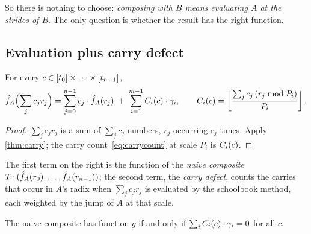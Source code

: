 \noindent So there is nothing to choose: \emph{composing with $B$ means evaluating $A$ at the
strides of $B$}. The only question is whether the result has the right function.

\subsection{Evaluation plus carry defect}

\begin{theorem}\label{thm:defect}
For every $c\in[t_0]\times\dots\times[t_{n-1}]$,
\begin{equation}\label{eq:defect}
 \hat{f}_{A}\Bigl(\sum_jc_jr_j\Bigr)=\sum_{j=0}^{n-1}c_j\cdot\hat{f}_{A}(r_j)\;+\;\sum_{i=1}^{m-1}C_i(c)\cdot\gamma_i,
\qquad
 C_i(c)=\left\lfloor \frac{\sum_jc_j\,(r_j\bmod P_i)}{P_i} \right\rfloor .
\end{equation}
\end{theorem}
\begin{proof}
$\sum_jc_jr_j$ is a sum of $\sum_jc_j$ numbers, $r_j$ occurring $c_j$ times. Apply
\cref{thm:carry}; the carry count~\eqref{eq:carrycount} at scale $P_i$ is $C_i(c)$.
\end{proof}

The first term on the right is the function of the \emph{naive composite}
$T\,{:}\,(\hat{f}_{A}(r_0),\dots,\hat{f}_{A}(r_{n-1}))$; the second term, the \emph{carry defect}, counts
the carries that occur in $A$'s radix when $\sum_jc_jr_j$ is evaluated by the schoolbook
method, each weighted by the jump of $A$ at that scale.

\begin{corollary}[\mech]\label{cor:naive}
The naive composite has function $g$ if and only if $\sum_iC_i(c)\cdot\gamma_i=0$ for all $c$.
\end{corollary}

